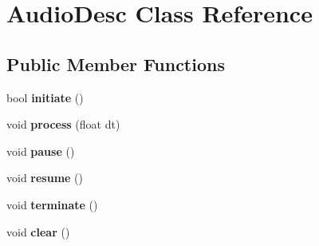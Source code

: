 \hypertarget{class_audio_desc}{}\section{Audio\+Desc Class Reference}
\label{class_audio_desc}
\subsection*{Public Member Functions}
\begin{DoxyCompactItemize}
\item 
bool {\bfseries initiate} ()\hypertarget{class_audio_desc_a1f76a0d80b5f6566a129db3fefb26fe2}{}\label{class_audio_desc_a1f76a0d80b5f6566a129db3fefb26fe2}

\item 
void {\bfseries process} (float dt)\hypertarget{class_audio_desc_a29fdeb8c0d95ba029de39155b3ffac82}{}\label{class_audio_desc_a29fdeb8c0d95ba029de39155b3ffac82}

\item 
void {\bfseries pause} ()\hypertarget{class_audio_desc_a7a9448b6f00df9fde9a9c868792483c6}{}\label{class_audio_desc_a7a9448b6f00df9fde9a9c868792483c6}

\item 
void {\bfseries resume} ()\hypertarget{class_audio_desc_a2cfb964985dc65f8684ca6b74a3873de}{}\label{class_audio_desc_a2cfb964985dc65f8684ca6b74a3873de}

\item 
void {\bfseries terminate} ()\hypertarget{class_audio_desc_a9dea39ccc6c37a519fd7493b2d801011}{}\label{class_audio_desc_a9dea39ccc6c37a519fd7493b2d801011}

\item 
void {\bfseries clear} ()\hypertarget{class_audio_desc_ac7a8949c98471a8c7799ace8dacc2762}{}\label{class_audio_desc_ac7a8949c98471a8c7799ace8dacc2762}

\end{DoxyCompactItemize}

